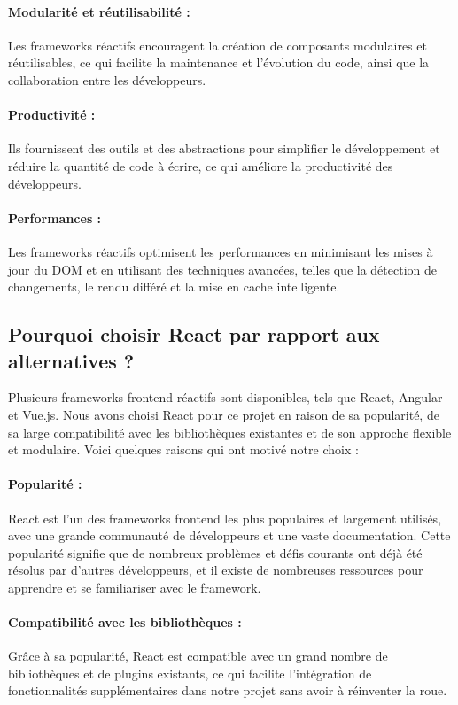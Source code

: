 \paragraph{Modularité et réutilisabilité :} Les frameworks réactifs encouragent la création de composants modulaires et réutilisables, ce qui facilite la maintenance et l'évolution du code, ainsi que la collaboration entre les développeurs.
\paragraph{Productivité :} Ils fournissent des outils et des abstractions pour simplifier le développement et réduire la quantité de code à écrire, ce qui améliore la productivité des développeurs.
\paragraph{Performances :} Les frameworks réactifs optimisent les performances en minimisant les mises à jour du \Gls{DOM} et en utilisant des techniques avancées, telles que la détection de changements, le rendu différé et la mise en cache intelligente.

\subsection{Pourquoi choisir React par rapport aux alternatives ?}

Plusieurs frameworks frontend réactifs sont disponibles, tels que React, Angular et Vue.js. Nous avons choisi React\cite{QuickStartReact} pour ce projet en raison de sa popularité, de sa large compatibilité avec les bibliothèques existantes et de son approche flexible et modulaire. Voici quelques raisons qui ont motivé notre choix :

\paragraph{Popularité :} React est l'un des frameworks frontend les plus populaires et largement utilisés, avec une grande communauté de développeurs et une vaste documentation. Cette popularité signifie que de nombreux problèmes et défis courants ont déjà été résolus par d'autres développeurs, et il existe de nombreuses ressources pour apprendre et se familiariser avec le framework.
\paragraph{Compatibilité avec les bibliothèques :} Grâce à sa popularité, React est compatible avec un grand nombre de bibliothèques et de plugins existants, ce qui facilite l'intégration de fonctionnalités supplémentaires dans notre projet sans avoir à réinventer la roue.
